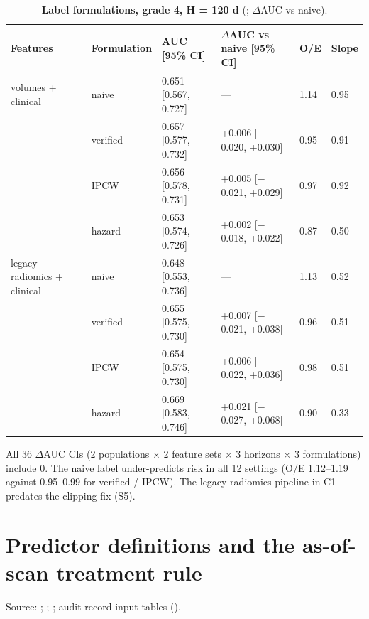 \documentclass[11pt,a4paper]{article}
\begin{document}
\begin{table}[H]
\centering
\small
\renewcommand{\thetable}{S5}\renewcommand{\theHtable}{S5}
\caption{\textbf{Label formulations, grade 4, H = 120 d} (; $\Delta$AUC vs naive).}
\label{tab:S5}
\begin{tabularx}{\linewidth}{@{}L R{1.92cm} R{3.60cm} R{4.12cm} R{0.80cm} R{0.88cm}@{}}
\toprule
Features & Formulation & AUC [95\% CI] & $\Delta$AUC vs naive [95\% CI] & O/E & Slope \\
\midrule
volumes + clinical & naive & 0.651 [0.567, 0.727] & --- & 1.14 & 0.95 \\
 & verified & 0.657 [0.577, 0.732] & +0.006 [$-$0.020, +0.030] & 0.95 & 0.91 \\
 & IPCW & 0.656 [0.578, 0.731] & +0.005 [$-$0.021, +0.029] & 0.97 & 0.92 \\
 & hazard & 0.653 [0.574, 0.726] & +0.002 [$-$0.018, +0.022] & 0.87 & 0.50 \\
legacy radiomics + clinical & naive & 0.648 [0.553, 0.736] & --- & 1.13 & 0.52 \\
 & verified & 0.655 [0.575, 0.730] & +0.007 [$-$0.021, +0.038] & 0.96 & 0.51 \\
 & IPCW & 0.654 [0.575, 0.730] & +0.006 [$-$0.022, +0.036] & 0.98 & 0.51 \\
 & hazard & 0.669 [0.583, 0.746] & +0.021 [$-$0.027, +0.068] & 0.90 & 0.33 \\
\bottomrule
\end{tabularx}
\end{table}

All 36 $\Delta$AUC CIs (2 populations $\times$ 2 feature sets $\times$ 3 horizons $\times$ 3 formulations)
include 0. The naive label under-predicts risk in all 12 settings (O/E 1.12--1.19 against 0.95--0.99 for
verified / IPCW). The legacy radiomics pipeline in C1 predates the clipping fix (S5).

\FloatBarrier
\section{Predictor definitions and the as-of-scan treatment rule}\label{sec:S4}

Source: ;
;
; audit record input tables
().
\end{document}
